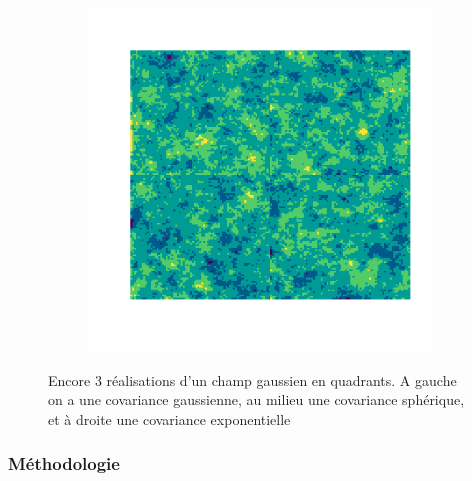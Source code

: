 \documentclass[10pt]{article} %
\begin{document}
\begin{figure}[h!]
\begin{subfigure}[b]{0.3\textwidth}
        \label{fig:three sin x}
    \end{subfigure}
    \hfill
    \begin{subfigure}[b]{0.3\textwidth}
        \centering
        \includegraphics[width=\textwidth]{media/exp_2.png}
        \label{fig:five over x}
    \end{subfigure}
       \caption{Encore 3 réalisations d'un champ gaussien en quadrants. A gauche on a une covariance gaussienne, au milieu une covariance
       sphérique, et à droite une covariance exponentielle}
       \label{fig:three graphs}
\end{figure}

\subsubsection{Méthodologie}

\end{document}
